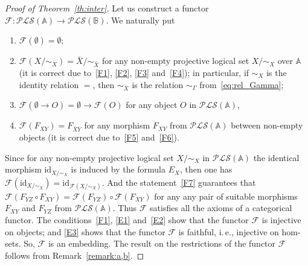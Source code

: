 \documentclass[12pt]{article}
\theoremstyle{definition}
\def\MA{{\mathbb{A}}}
\def\MB{{\mathbb{B}}}
\def\F{{\mathcal{F}}}
\def\PLS{{\mathcal{PLS}}}
\def\id{{\mathrm{id}}}
\begin{document}
\begin{proof}[Proof of Theorem~\ref{th:inter}]
Let us construct a functor $\F\colon \PLS(\MA)\to \PLS(\MB)$. We naturally put
\begin{enumerate}[label=\arabic*.]
\item $\F(\emptyset)=\emptyset$; 
\item $\F(X/{\sim_X})=\bar X/{\sim_{\bar X}}$ for any non-empty projective logical set $X/{\sim_X}$ over $\MA$ (it is correct due to~\ref{F1}, \ref{F2}, \ref{F3} and~\ref{F4}); in particular, if $\sim_X$ is the identity relation $=$, then $\sim_{\bar X}$ is the relation $\sim_\Gamma$ from~\eqref{eq:rel_Gamma};
\item $\F(\emptyset \to O)=\emptyset\to \F(O)$ for any object $O$ in $\PLS(\MA)$,
\item $\F(F_{XY})=F_{\bar X \bar Y}$ for any morphism $F_{XY}$ from $\PLS(\MA)$ between non-empty objects (it is correct due to~\ref{F5} and~\ref{F6}).
\end{enumerate} 
Since for any non-empty projective logical set $X/{\sim_X}$ in $\PLS(\MA)$ the identical morphism $\id_{X/{\sim_X}}$ is induced by the formula $E_X$, then one has $\F(\id_{X/{\sim_X}})=\id_{\F(X/{\sim_X})}$. And the statement~\ref{F7} guarantees that $\F(F_{YZ}\circ F_{XY})=\F(F_{YZ})\circ \F(F_{XY})
$ for any any pair of suitable morphisms $F_{XY}$ and $F_{YZ}$ from $\PLS(\MA)$. Thus $\F$ satisfies all the axioms of a categorical functor. The conditions~\ref{F1}, \ref{E1} and~\ref{E2} show that the functor $\F$ is injective on objects; and \ref{E3} shows that the functor $\F$ is faithful, i.\,e., injective on hom-sets. So, $\F$ is an embedding. The result on the restrictions of the functor $\F$ follows from Remark~\ref{remark:a,b}.
\end{proof}
\end{document}
